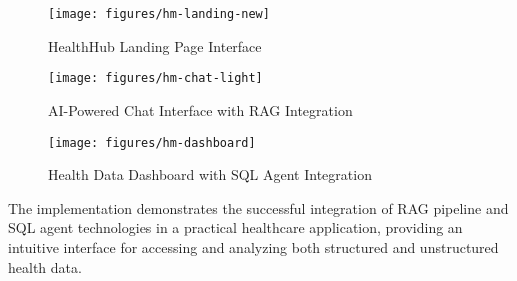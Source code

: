 \begin{figure}[!t]
\centering
\texttt{[image: figures/hm-landing-new]}
\caption{HealthHub Landing Page Interface}
\label{fig:landing-page}
\end{figure}

\begin{figure}[!t]
\centering
\texttt{[image: figures/hm-chat-light]}
\caption{AI-Powered Chat Interface with RAG Integration}
\label{fig:chat-interface}
\end{figure}

\begin{figure}[!t]
\centering
\texttt{[image: figures/hm-dashboard]}
\caption{Health Data Dashboard with SQL Agent Integration}
\label{fig:dashboard}
\end{figure}

The implementation demonstrates the successful integration of RAG pipeline and SQL agent technologies in a practical healthcare application, providing an intuitive interface for accessing and analyzing both structured and unstructured health data. 